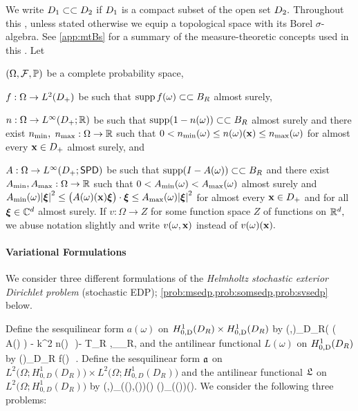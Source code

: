 We write $D_{1} \subset\subset D_{2}$ if $D_{1}$ is a compact subset of the open set $D_{2}.$ Throughout this , unless stated otherwise we equip a topological space with its Borel $\sigma$-algebra. See \cref{app:mtBs} for a summary of the measure-theoretic concepts used in this . Let
\bit
\item $\OFP$ be a complete probability space,
\item $f:\Omega\rightarrow\LtDp$ be such that $\operatorname{supp} f(\omega) \subset\subset B_{R}$ almost surely,
\item $n:\Omega\rightarrow \LiDpRR$ be such that $\operatorname{supp}(1-n(\omega)) \subset\subset B_{R}$ almost surely and there exist $n_{\min},$ $n_{\max}:\Omega\rightarrow \mathbb R$ such that
$0 < n_{\min}(\omega) \leq n(\omega)(\mathbf{x}) \leq n_{\max}(\omega)$
for almost every $\mathbf{x} \in D_{+}$ almost surely, and
\item $A:\Omega\rightarrow\LiDpspd$ be such that $\operatorname{supp}(I-A(\omega)) \subset\subset B_{R}$ and there exist $A_{\min},A_{\max}:\Omega \rightarrow \mathbb R$ such that $0 < A_{\min}(\omega) < A_{\max}(\omega)$ almost surely and
$\Amin(\omega)\abs{\bxi}^2 \leq \big(A(\omega)(\bx)\bxi\big)\cdot\bxi \leq \Amax(\omega)\abs{\bxi}^2$
for almost every $\mathbf{x} \in D_{+}$ and for all $\boldsymbol{\xi} \in \mathbb C^{d}$ almost surely.
\eit
If $v:\Omega \rightarrow Z$ for some function space $Z$ of functions on $\mathbb R^{d},$ we abuse notation slightly and write $v(\omega,\mathbf{x})$ instead of $v(\omega)(\mathbf{x}).$


%

\paragraph{Variational Formulations} We consider three different formulations of the  \emph{Helmholtz stochastic exterior Dirichlet problem} (stochastic EDP); \cref{prob:msedp,prob:somsedp,prob:svsedp} below.

Define the sesquilinear form $a(\omega)$ on $\HozDDR \times \HozDDR$ by
\beq\label{eq:SEDPa}
\mleft(\vo,\vt\mright)\de\int_{D_R}\Big( \mleft( A(\omega) \grad \vo\mright)\cdot \grad \vtb 
 - k^2 n(\omega)\, \vo\,\vtb \Big)\dd\Leb- \big\langle T_R \gamma \vo,\gamma \vt\big\rangle_{\Gamma_R},
 \eeq
 and the antilinear functional $L(\omega)$ on $\HozDDR$ by
\beq\label{eq:SEDPL}
(\vt)\de \int_{D_R} f(\omega)\, \vtb\,\dd\Leb.
\eeq
Define the sesquilinear form $\mathfrak{a}$ on $L^2\big(\Omega;H_{0,D}^1(D_R)\big)\times L^2\big(\Omega;H_{0,D}^1(D_R)\big)$ and the antilinear functional $\mathfrak{L}$ on $L^2\big(\Omega;H_{0,D}^1(D_R)\big)$ by 
\beq\label{eq:SEDPas}
\as\mleft(\vo,\vt\mright)\de \int_\Omega {}\mleft(\vo(\omega),\vt(\omega)\mright)\dd\PP(\omega)
\quad{} \quad
%
\Ls(\vt)\de \int_\Omega {}\mleft(\vt(\omega)\mright)\dd\PP(\omega).
\eeq
We consider the following three problems:

